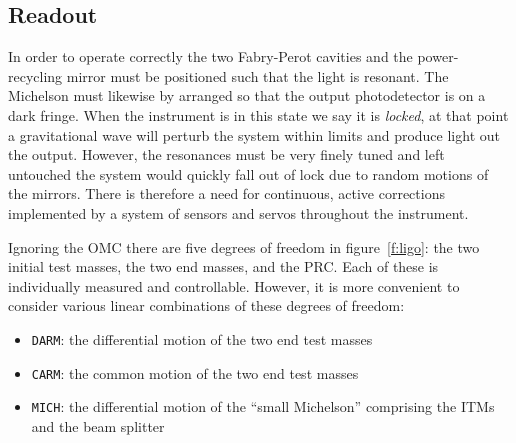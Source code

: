 \subsection{Readout}
\label{ssec:readout}

In order to operate correctly the two Fabry-Perot cavities and the
power-recycling mirror must be positioned such that the light is
resonant.  The Michelson must likewise by arranged so that the output
photodetector is on a dark fringe.  When the instrument is in this
state we say it is \emph{locked}, at that point a gravitational wave
will perturb the system within limits and produce light out the
output.  However, the resonances must be very finely tuned and left
untouched the system would quickly fall out of lock due to random
motions of the mirrors.  There is therefore a need for continuous,
active corrections implemented by a system of sensors and servos
throughout the instrument.

Ignoring the OMC there are five degrees of freedom in
figure~\ref{f:ligo}: the two initial test masses, the two end masses,
and the PRC.  Each of these is individually measured and controllable.
However, it is more convenient to consider various linear combinations
of these degrees of freedom:

\begin{itemize}
\item \texttt{DARM}: the differential motion of the two end test masses
\item \texttt{CARM}: the common motion of the two end test masses
\item \texttt{MICH}: the differential motion of the ``small Michelson'' comprising
the ITMs and the beam splitter
\end{itemize}

